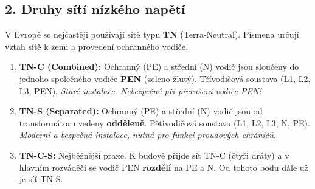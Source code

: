 \documentclass[a4paper,10pt]{article}
\begin{document}
\begin{vysvetlenibox}
\subsection*{2. Druhy sítí nízkého napětí}

V Evropě se nejčastěji používají sítě typu \textbf{TN} (Terra-Neutral). Písmena určují vztah sítě k zemi a provedení ochranného vodiče.

\begin{enumerate}
    \item \textbf{TN-C (Combined):} Ochranný (PE) a střední (N) vodič jsou sloučeny do jednoho společného vodiče \textbf{PEN} (zeleno-žlutý). Třívodičová soustava (L1, L2, L3, PEN). \textit{Staré instalace. Nebezpečné při přerušení vodiče PEN!}
    \item \textbf{TN-S (Separated):} Ochranný (PE) a střední (N) vodič jsou od transformátoru vedeny \textbf{odděleně}. Pětivodičová soustava (L1, L2, L3, N, PE). \textit{Moderní a bezpečná instalace, nutná pro funkci proudových chráničů.}
    \item \textbf{TN-C-S:} Nejběžnější praxe. K budově přijde síť TN-C (čtyři dráty) a v hlavním rozváděči se vodič PEN \textbf{rozdělí} na PE a N. Od tohoto bodu dále už je síť TN-S.
\end{enumerate}

\begin{center}
\end{center}
\end{vysvetlenibox}
\end{document}
